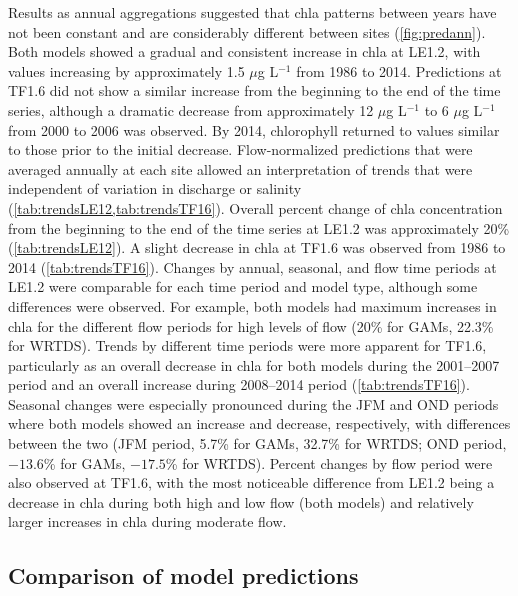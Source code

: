 \documentclass[letterpaper,12pt,oneside]{article}\usepackage[]{graphicx}\usepackage[]{color}
\newcommand{\mugl}{$\mu$g L$^{-1}$ }
\begin{document}
Results as annual aggregations suggested that \ac{chla} patterns between years have not been constant and are considerably different between sites (\cref{fig:predann}).  Both models showed a gradual and consistent increase in \ac{chla} at LE1.2, with values increasing by approximately 1.5 \mugl from 1986 to 2014.  Predictions at TF1.6 did not show a similar increase from the beginning to the end of the time series, although a dramatic decrease from approximately 12 \mugl to 6 \mugl from 2000 to 2006 was observed. By 2014, chlorophyll returned to values similar to those prior to the initial decrease.  Flow-normalized predictions that were averaged annually at each site allowed an interpretation of trends that were independent of variation in discharge or salinity (\cref{tab:trendsLE12,tab:trendsTF16}).  Overall percent change of \ac{chla} concentration from the beginning to the end of the time series at LE1.2 was approximately 20\% (\cref{tab:trendsLE12}).  A slight decrease in \ac{chla} at TF1.6 was observed from 1986 to 2014 (\cref{tab:trendsTF16}).  Changes by annual, seasonal, and flow time periods at LE1.2 were comparable for each time period and model type, although some differences were observed.  For example, both models had maximum increases in \ac{chla} for the different flow periods for high levels of flow (20\% for \acp{GAM}, 22.3\% for \ac{WRTDS}).  Trends by different time periods were more apparent for TF1.6, particularly as an overall decrease in \ac{chla} for both models during the 2001--2007 period and an overall increase during 2008--2014 period (\cref{tab:trendsTF16}).  Seasonal changes were especially pronounced during the \ac{JFM} and \ac{OND} periods where both models showed an increase and decrease, respectively, with differences between the two (\ac{JFM} period, 5.7\% for \acp{GAM}, 32.7\% for \ac{WRTDS}; \ac{OND} period, \ensuremath{-13.6}\% for \acp{GAM}, \ensuremath{-17.5}\% for \ac{WRTDS}).  Percent changes by flow period were also observed at TF1.6, with the most noticeable difference from LE1.2 being a decrease in \ac{chla} during both high and low flow (both models) and relatively larger increases in \ac{chla} during moderate flow.  

\subsection{Comparison of model predictions}
\end{document}
